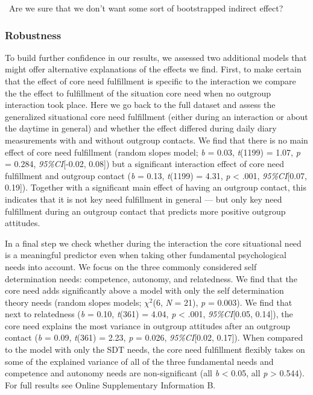 \faQuestionCircle~Are we sure that we don't want some sort of
bootstrapped indirect effect?

\subsubsection{Robustness}

To build further confidence in our results, we assessed two additional
models that might offer alternative explanations of the effects we find.
First, to make certain that the effect of core need fulfillment is
specific to the interaction we compare the the effect to fulfillment of
the situation core need when no outgroup interaction took place. Here we
go back to the full dataset and assess the generalized situational core
need fulfillment (either during an interaction or about the daytime in
general) and whether the effect differed during daily diary measurements
with and without outgroup contacts. We find that there is no main effect
of core need fulfillment (random slopes model; \textit{b} = 0.03,
\textit{t}(1199) = 1.07, \textit{p} = 0.284, \textit{95\%CI}{[}-0.02,
0.08{]}) but a significant interaction effect of core need fulfillment
and outgroup contact (\textit{b} = 0.13, \textit{t}(1199) = 4.31,
\textit{p} \textless{} .001, \textit{95\%CI}{[}0.07, 0.19{]}). Together
with a significant main effect of having an outgroup contact, this
indicates that it is not key need fulfillment in general --- but only
key need fulfillment during an outgroup contact that predicts more
positive outgroup attitudes.

In a final step we check whether during the interaction the core
situational need is a meaningful predictor even when taking other
fundamental psychological needs into account. We focus on the three
commonly considered self determination needs: competence, autonomy, and
relatedness. We find that the core need adds significantly above a model
with only the self determination theory needs (random slopes models;
\(\chi^2\)(6, \textit{N} = 21), \textit{p} = 0.003). We find that next
to relatedness (\textit{b} = 0.10, \textit{t}(361) = 4.04, \textit{p}
\textless{} .001, \textit{95\%CI}{[}0.05, 0.14{]}), the core need
explains the most variance in outgroup attitudes after an outgroup
contact (\textit{b} = 0.09, \textit{t}(361) = 2.23, \textit{p} = 0.026,
\textit{95\%CI}{[}0.02, 0.17{]}). When compared to the model with only
the SDT needs, the core need fulfillment flexibly takes on some of the
explained variance of all of the three fundamental needs and competence
and autonomy needs are non-significant (all \textit{b} \textless{} 0.05,
all \textit{p} \textgreater{} 0.544). For full results see Online
Supplementary Information B.

